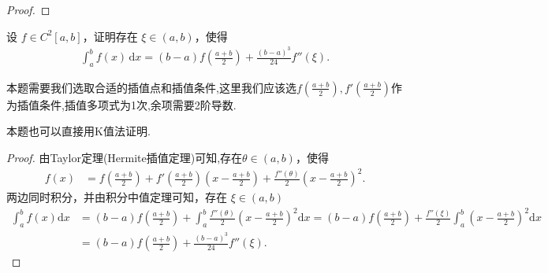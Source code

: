 \documentclass[../../main.tex]{subfiles}
\begin{document}
\begin{proof}
\end{proof}

\begin{example}
设 $f \in C^2[a, b]$，证明存在 $\xi \in (a, b)$，使得
\begin{align*}
\int_a^b f(x) \, \mathrm{d}x = (b - a) f \left( \frac{a + b}{2} \right) + \frac{(b - a)^3}{24} f''(\xi).
\end{align*}
\end{example}
\begin{note}
本题需要我们选取合适的插值点和插值条件,这里我们应该选$f(\frac{a+b}{2}),f'(\frac{a+b}{2})$作为插值条件,插值多项式为1次,余项需要2阶导数.
\end{note}
\begin{remark}
本题也可以直接用K值法证明.
\end{remark}
\begin{proof}
由Taylor定理(Hermite插值定理)可知,存在$\theta \in \left( a,b \right)$，使得
\begin{align*}
f\left( x \right) &= f\left( \frac{a+b}{2} \right) + f'\left( \frac{a+b}{2} \right) \left( x - \frac{a+b}{2} \right) + \frac{f'' \left( \theta \right)}{2}\left( x - \frac{a+b}{2} \right)^2.
\end{align*}
两边同时积分，并由积分中值定理可知，存在 $\xi \in \left( a,b \right)$
\begin{align*}
\int_a^b{f\left( x \right) \mathrm{d}x} &= \left( b-a \right) f\left( \frac{a+b}{2} \right) + \int_a^b{\frac{f'' \left( \theta \right)}{2}\left( x - \frac{a+b}{2} \right)^2 \mathrm{d}x}
= \left( b-a \right) f\left( \frac{a+b}{2} \right) + \frac{f'' \left( \xi \right)}{2} \int_a^b{\left( x - \frac{a+b}{2} \right)^2 \mathrm{d}x} \\
&= \left( b-a \right) f\left( \frac{a+b}{2} \right) + \frac{\left( b-a \right)^3}{24} f'' \left( \xi \right).
\end{align*}

\end{proof}
\end{document}
